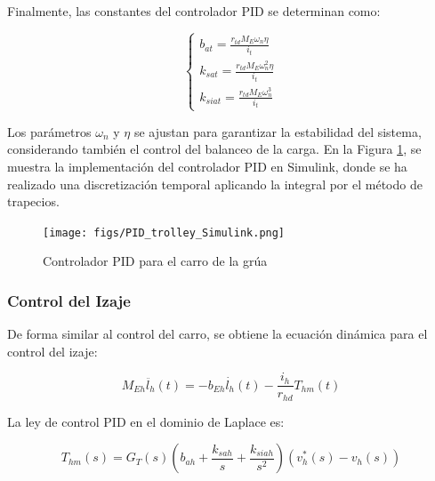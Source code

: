 \documentclass{article}
\begin{document}
            Finalmente, las constantes del controlador PID se determinan como:
            
            \begin{equation}
                \begin{cases}
                    b_{at} = \frac{r_{td}M_E \omega_n \eta}{i_t} \\
                    k_{sat} = \frac{r_{td}M_E \omega_n^2 \eta}{i_t} \\
                    k_{siat} = \frac{r_{td}M_E \omega_n^3}{i_t}
                \end{cases}
            \end{equation}
            
            Los parámetros $\omega_n$ y $\eta$ se ajustan para garantizar la estabilidad del sistema, considerando también el control del balanceo de la carga. En la Figura \ref{fig:pid_trolley_simulink}, se muestra la implementación del controlador PID en Simulink, donde se ha realizado una discretización temporal aplicando la integral por el método de trapecios.
            
            \begin{figure}[H]
                \centering
                \texttt{[image: figs/PID\_trolley\_Simulink.png]}
                \caption{Controlador PID para el carro de la grúa}
                \label{fig:pid_trolley_simulink}
            \end{figure}
            


        \subsubsection{Control del Izaje}

            De forma similar al control del carro, se obtiene la ecuación dinámica para el control del izaje:
            
            \begin{equation}
                M_{Eh} \ddot{l_h}(t) = -b_{Eh} \dot{l_h}(t) - \frac{i_h}{r_{hd}} T_{hm}(t)
            \end{equation}
            
            La ley de control PID en el dominio de Laplace es:
            
            \begin{equation}
                T_{hm}(s) = G_T(s) \left( b_{ah} + \frac{k_{sah}}{s} + \frac{k_{siah}}{s^2} \right) \left( v_h^*(s) - v_h(s) \right)
            \end{equation}
            
\end{document}

